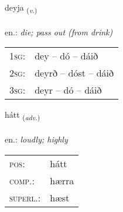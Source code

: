 \documentclass[frontgrid, backgrid]{flacards}\usepackage[]{graphicx}\usepackage[]{xcolor}
\begin{document}
\renewcommand{\flhead}{\vskip5pt \fboxsep=0pt {\small\bfseries\footnotesize Sagnorð | Verb}}
\renewcommand{\fcfoot}{\vskip5pt \fboxsep=0pt \hspace{2pt}{\small\bfseries\footnotesize 1K}}

\renewcommand{\blhead}{\vskip5pt {\small\bfseries\footnotesize Sagnorð | Verb }}
\renewcommand{\bcfoot}{\vskip5pt \hspace{2pt}{\small\bfseries\footnotesize 1K}}


{deyja \small{\textsubscript{(\textit{v.})}} \\[1ex] %
\textphonetic{[teiːja]} \\
en.: \emph{die; pass out (from drink)} \\  [2ex]
\renewcommand*{\arraystretch}{0.8}
\begin{tabular}{p{1cm}l}
\textsc{1sg}: & dey -- dó -- dáið \\ 
\textsc{2sg}: & deyrð -- dóst -- dáið \\ 
\textsc{3sg}: & deyr -- dó -- dáið \\ 
\end{tabular}
}

\renewcommand{\flhead}{\vskip5pt \fboxsep=0pt {\small\bfseries\footnotesize Atviksorð | Adverb}}
\renewcommand{\fcfoot}{\vskip5pt \fboxsep=0pt \hspace{2pt}{\small\bfseries\footnotesize 1K}}

\renewcommand{\blhead}{\vskip5pt {\small\bfseries\footnotesize Atviksorð | Adverb }}
\renewcommand{\bcfoot}{\vskip5pt \hspace{2pt}{\small\bfseries\footnotesize 1K}}


{hátt \small{\textsubscript{(\textit{adv.})}} \\[1ex] %
\textphonetic{[hauht]} \\
en.: \emph{loudly; highly} \\  [2ex]
\renewcommand*{\arraystretch}{0.8}
\begin{tabular}{ll}
\textsc{pos}: & hátt \\ 
\textsc{comp.}: & hærra \\ 
\textsc{superl.}: & hæst \\
\end{tabular}
}
\end{document}
